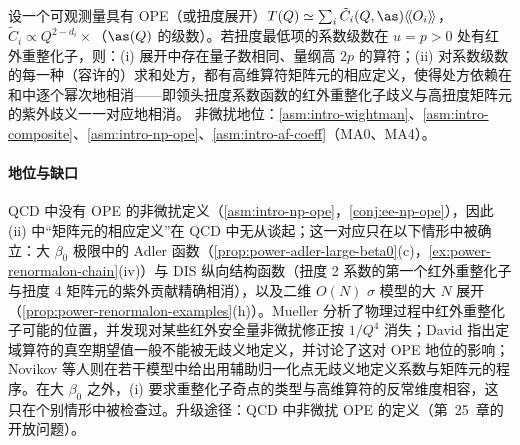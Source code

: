 \begin{conjecture}\label{conj:power-renormalon-ht}
设一个可观测量具有 OPE（或扭度展开）$T(Q)\simeq\sum_i\tilde C_i(Q,\as)\langle\!\langle O_i\rangle\!\rangle$，$\tilde C_i\propto Q^{2-d_i}\times$（$\as(Q)$ 的级数）。若扭度最低项的系数级数在 $u=p>0$ 处有红外重整化子，则：(i) 展开中存在量子数相同、量纲高 $2p$ 的算符；(ii) 对系数级数的每一种（容许的）求和处方，都有高维算符矩阵元的相应定义，使得处方依赖在和中逐个幂次地相消——即领头扭度系数函数的红外重整化子歧义与高扭度矩阵元的紫外歧义一一对应地相消\cite{Mueller1985,David:1983gz,David:1985xj,Novikov:1984rf,tHooft1979}。
非微扰地位：\cref{asm:intro-wightman}、\cref{asm:intro-composite}、\cref{asm:intro-np-ope}、\cref{asm:intro-af-coeff}（MA0、MA4）。
\end{conjecture}

\paragraph{地位与缺口}
QCD 中没有 OPE 的非微扰定义（\cref{asm:intro-np-ope}，\cref{conj:ee-np-ope}），因此 (ii) 中“矩阵元的相应定义”在 QCD 中无从谈起；这一对应只在以下情形中被确立：大 $\beta_0$ 极限中的 Adler 函数（\cref{prop:power-adler-large-beta0}(c)，\cref{ex:power-renormalon-chain}(iv)）与 DIS 纵向结构函数（扭度 2 系数的第一个红外重整化子与扭度 4 矩阵元的紫外贡献精确相消\cite[第~4.2.2~节]{Beneke1999}），以及二维 $O(N)$ $\sigma$ 模型的大 $N$ 展开（\cref{prop:power-renormalon-examples}(h)）。Mueller 分析了物理过程中红外重整化子可能的位置，并发现对某些红外安全量非微扰修正按 $1/Q^4$ 消失\cite{Mueller1985}；David 指出定域算符的真空期望值一般不能被无歧义地定义，并讨论了这对 OPE 地位的影响\cite{David:1983gz,David:1985xj}；Novikov 等人则在若干模型中给出用辅助归一化点无歧义地定义系数与矩阵元的程序\cite{Novikov:1984rf}。在大 $\beta_0$ 之外，(i) 要求重整化子奇点的类型与高维算符的反常维度相容，这只在个别情形中被检查过\cite[第~5.2.1~节]{Beneke1999}。升级途径：QCD 中非微扰 OPE 的定义（第~25~章的开放问题）。
